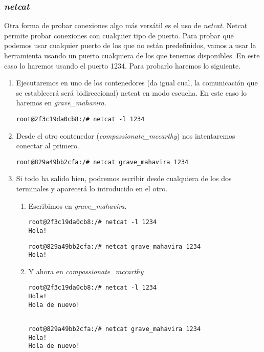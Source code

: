 			\subsubsection{\textit{netcat}}
			Otra forma de probar conexiones algo más versátil es el uso de \emph{netcat}. Netcat permite probar conexiones con cualquier tipo de puerto. Para probar que podemos usar cualquier puerto de los que no están predefinidos, vamos a usar la herramienta usando un puerto cualquiera de los que tenemos disponibles. En este caso lo haremos usando el puerto 1234. Para probarlo haremos lo siguiente.
			
			\begin{enumerate}
				\item Ejecutaremos en uno de los contenedores (da igual cual, la comunicación que se establecerá será bidireccional) netcat en modo escucha. En este caso lo haremos en \textit{grave\_mahavira}.
					\begin{lstlisting}[style=consola]
root@2f3c19da0cb8:/# netcat -l 1234

					\end{lstlisting}
				\item Desde el otro contenedor (\textit{compassionate\_mccarthy}) nos intentaremos conectar al primero.
					\begin{lstlisting}[style=consola]
root@829a49bb2cfa:/# netcat grave_mahavira 1234

					\end{lstlisting}			
				\item Si todo ha salido bien, podremos escribir desde cualquiera de los dos terminales y aparecerá lo introducido en el otro.
				\begin{enumerate}
					\item Escribimos en \textit{grave\_mahavira}.
					\begin{lstlisting}[style=consola]
root@2f3c19da0cb8:/# netcat -l 1234
Hola!

					\end{lstlisting}
					\begin{lstlisting}[style=consola]
root@829a49bb2cfa:/# netcat grave_mahavira 1234
Hola!

					\end{lstlisting}	
					\item Y ahora en \textit{compassionate\_mccarthy}
					\begin{lstlisting}[style=consola]
root@2f3c19da0cb8:/# netcat -l 1234
Hola!
Hola de nuevo!				
					
					\end{lstlisting}
					\begin{lstlisting}[style=consola]
root@829a49bb2cfa:/# netcat grave_mahavira 1234
Hola!
Hola de nuevo!
	
					\end{lstlisting}
				\end{enumerate}
			\end{enumerate}
		
